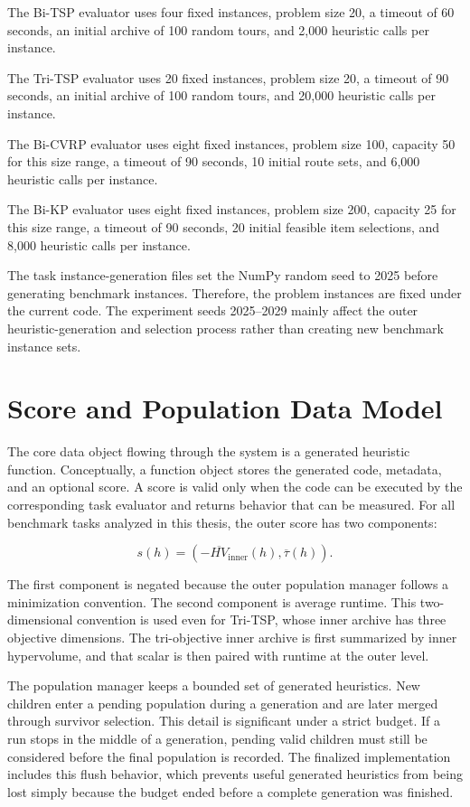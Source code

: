 \documentclass[../main.tex]{subfiles}
\begin{document}
The Bi-TSP evaluator uses four fixed instances, problem size 20, a timeout of 60 seconds, an initial archive of 100 random tours, and 2,000 heuristic calls per instance.

The Tri-TSP evaluator uses 20 fixed instances, problem size 20, a timeout of 90 seconds, an initial archive of 100 random tours, and 20,000 heuristic calls per instance.

The Bi-CVRP evaluator uses eight fixed instances, problem size 100, capacity 50 for this size range, a timeout of 90 seconds, 10 initial route sets, and 6,000 heuristic calls per instance.

The Bi-KP evaluator uses eight fixed instances, problem size 200, capacity 25 for this size range, a timeout of 90 seconds, 20 initial feasible item selections, and 8,000 heuristic calls per instance.

The task instance-generation files set the NumPy random seed to 2025 before generating benchmark instances. Therefore, the problem instances are fixed under the current code. The experiment seeds 2025--2029 mainly affect the outer heuristic-generation and selection process rather than creating new benchmark instance sets.

\section{Score and Population Data Model}

The core data object flowing through the system is a generated heuristic function. Conceptually, a function object stores the generated code, metadata, and an optional score. A score is valid only when the code can be executed by the corresponding task evaluator and returns behavior that can be measured. For all benchmark tasks analyzed in this thesis, the outer score has two components:

\begin{equation}
  s(h) = \left(-\overline{HV}_{\mathrm{inner}}(h), \overline{\tau}(h)\right).
\end{equation}

The first component is negated because the outer population manager follows a minimization convention. The second component is average runtime. This two-dimensional convention is used even for Tri-TSP, whose inner archive has three objective dimensions. The tri-objective inner archive is first summarized by inner hypervolume, and that scalar is then paired with runtime at the outer level.

The population manager keeps a bounded set of generated heuristics. New children enter a pending population during a generation and are later merged through survivor selection. This detail is significant under a strict budget. If a run stops in the middle of a generation, pending valid children must still be considered before the final population is recorded. The finalized implementation includes this flush behavior, which prevents useful generated heuristics from being lost simply because the budget ended before a complete generation was finished.
\end{document}
